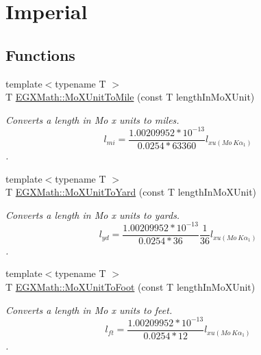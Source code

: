 \hypertarget{group___e_g_x_math-_conversions-_length_conversions-_non-_s_i-_mo_x_unit-_imperial}{}\section{Imperial}
\label{group___e_g_x_math-_conversions-_length_conversions-_non-_s_i-_mo_x_unit-_imperial}
\subsection*{Functions}
\begin{DoxyCompactItemize}
\item 
{\footnotesize template$<$typename T $>$ }\\T \mbox{\hyperlink{group___e_g_x_math-_conversions-_length_conversions-_non-_s_i-_mo_x_unit-_imperial_gabfdb228f43e8988c62daac3d6e71d7fa}{E\+G\+X\+Math\+::\+Mo\+X\+Unit\+To\+Mile}} (const T length\+In\+Mo\+X\+Unit)
\begin{DoxyCompactList}\small\item\em Converts a length in Mo x units to miles. \[ l_{mi}=\frac{1.00209952*10^{-13}}{0.0254 * 63360} l_{xu(Mo\ K\alpha_1)} \]. \end{DoxyCompactList}\item 
{\footnotesize template$<$typename T $>$ }\\T \mbox{\hyperlink{group___e_g_x_math-_conversions-_length_conversions-_non-_s_i-_mo_x_unit-_imperial_ga1b769f8b903e65e8d7027a9c427762ab}{E\+G\+X\+Math\+::\+Mo\+X\+Unit\+To\+Yard}} (const T length\+In\+Mo\+X\+Unit)
\begin{DoxyCompactList}\small\item\em Converts a length in Mo x units to yards. \[ l_{yd}= \frac{1.00209952*10^{-13}}{0.0254 * 36} \frac{1}{36} l_{xu(Mo\ K\alpha_1)} \]. \end{DoxyCompactList}\item 
{\footnotesize template$<$typename T $>$ }\\T \mbox{\hyperlink{group___e_g_x_math-_conversions-_length_conversions-_non-_s_i-_mo_x_unit-_imperial_ga4ea603df9560a6bba1fc18f36becdf00}{E\+G\+X\+Math\+::\+Mo\+X\+Unit\+To\+Foot}} (const T length\+In\+Mo\+X\+Unit)
\begin{DoxyCompactList}\small\item\em Converts a length in Mo x units to feet. \[ l_{ft}= \frac{1.00209952*10^{-13}}{0.0254 * 12} l_{xu(Mo\ K\alpha_1)} \]. \end{DoxyCompactList}\item 

\end{DoxyCompactItemize}

